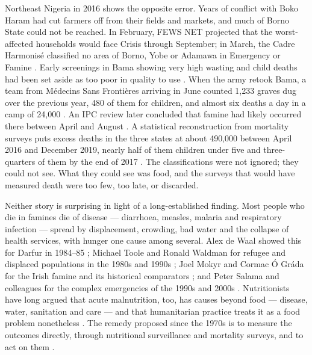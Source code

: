 \documentclass[11pt]{article}
\begin{document}
Northeast Nigeria in 2016 shows the opposite error. Years of conflict with Boko Haram had cut farmers off from their fields and markets, and much of Borno State could not be reached. In February, FEWS NET projected that the worst-affected households would face Crisis through September; in March, the Cadre Harmonis\'e classified no area of Borno, Yobe or Adamawa in Emergency or Famine \citep{fewsnet2016nigeriafeb,maxwell2018nigeria}. Early screenings in Bama showing very high wasting and child deaths had been set aside as too poor in quality to use \citep{maxwell2018nigeria}. When the army retook Bama, a team from M\'edecins Sans Fronti\`eres arriving in June counted 1,233 graves dug over the previous year, 480 of them for children, and almost six deaths a day in a camp of 24,000 \citep{msf2016bama}. An IPC review later concluded that famine had likely occurred there between April and August \citep{fewsnet2016bama}. A statistical reconstruction from mortality surveys puts excess deaths in the three states at about 490,000 between April 2016 and December 2019, nearly half of them children under five and three-quarters of them by the end of 2017 \citep{checchi2023nigeria}. The classifications were not ignored; they could not see. What they could see was food, and the surveys that would have measured death were too few, too late, or discarded.

Neither story is surprising in light of a long-established finding. Most people who die in famines die of disease --- diarrhoea, measles, malaria and respiratory infection --- spread by displacement, crowding, bad water and the collapse of health services, with hunger one cause among several. Alex de Waal showed this for Darfur in 1984--85 \citep{dewaal1989famine,dewaal1989popstud}; Michael Toole and Ronald Waldman for refugee and displaced populations in the 1980s and 1990s \citep{toole1990,toole1997}; Joel Mokyr and Cormac \'O Gr\'ada for the Irish famine and its historical comparators \citep{mokyr2002}; and Peter Salama and colleagues for the complex emergencies of the 1990s and 2000s \citep{salama2001,salama2004}. Nutritionists have long argued that acute malnutrition, too, has causes beyond food --- disease, water, sanitation and care --- and that humanitarian practice treats it as a food problem nonetheless \citep{unicef1990,youngjaspars1995assess,youngjaspars2006,youngmarshak2017}. The remedy proposed since the 1970s is to measure the outcomes directly, through nutritional surveillance and mortality surveys, and to act on them \citep{mason1984surveillance,DarcyHofmann2003,checchiroberts2005,bilukha2012surveillance}.
\end{document}
